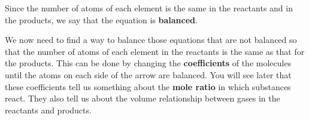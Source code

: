         \label{m38726*id63639}Since the number of atoms of each element is the same in the reactants and in the products, we say that the equation is \textbf{balanced}.\par 
        \label{m38726*id63649}We now need to find a way to balance those equations that are not balanced so that the number of atoms of each element in the reactants is the same as that for the products. This can be done by changing the \textbf{coefficients} of the molecules until the atoms on each side of the arrow are balanced. You will see later that these coefficients tell us something about the \textbf{mole ratio} in which substances react. They also tell us about the volume relationship between gases in the reactants and products.\par 
\label{m38726*notfhsst!!!underscore!!!id276}
      \label{m38726*eip-619}
